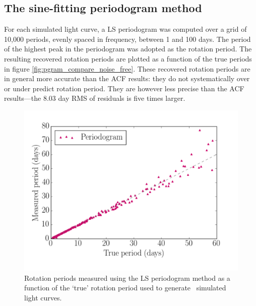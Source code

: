 \subsection{The sine-fitting periodogram method}

For each simulated light curve, a LS periodogram was computed over a grid of
10,000 periods, evenly spaced in frequency, between 1 and 100 days.
The period of the highest peak in the periodogram was adopted as the rotation
period.
The resulting recovered rotation periods are plotted as a function of the true
periods in figure \ref{fig:pgram_compare_noise_free}.
These recovered rotation periods are in general more accurate than the ACF
results: they do not systematically over or under predict rotation period.
They are however less precise than the ACF results---the 8.03 day RMS of
residuals is five times larger.

\begin{figure}
\begin{center}
\includegraphics[width=6in, clip=true]{figures/compare_pgram.pdf}
\caption[LS periodogram results.]
{Rotation periods measured using the LS periodogram method as a
function of the `true' rotation period used to generate \nlightcurves\
simulated light curves.}
\end{center}
\end{figure}
\label{fig:pgram_compare_noise_free}

